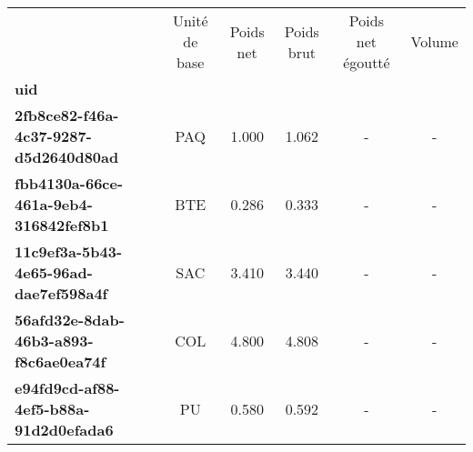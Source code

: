 \begin{tabular}{lccccc}
\toprule
{} & Unité de base &  Poids net &  Poids brut &  Poids net égoutté &  Volume \\
\textbf{uid                                 } &               &            &             &                    &         \\
\midrule
\textbf{2fb8ce82-f46a-4c37-9287-d5d2640d80ad} &           PAQ &      1.000 &       1.062 &                  - &       - \\
\textbf{fbb4130a-66ce-461a-9eb4-316842fef8b1} &           BTE &      0.286 &       0.333 &                  - &       - \\
\textbf{11c9ef3a-5b43-4e65-96ad-dae7ef598a4f} &           SAC &      3.410 &       3.440 &                  - &       - \\
\textbf{56afd32e-8dab-46b3-a893-f8c6ae0ea74f} &           COL &      4.800 &       4.808 &                  - &       - \\
\textbf{e94fd9cd-af88-4ef5-b88a-91d2d0efada6} &            PU &      0.580 &       0.592 &                  - &       - \\
\bottomrule
\end{tabular}
